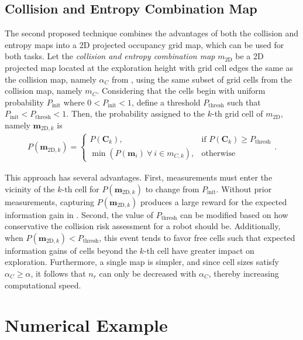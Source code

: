 \subsection{Collision and Entropy Combination Map}
The second proposed technique combines the advantages of both the collision and entropy maps into a 2D projected occupancy grid map, which can be used for both tasks. Let the \emph{collision and entropy combination map} $ m_\text{2D}$ be a 2D projected map located at the exploration height with grid cell edges the same as the collision map, namely $\alpha_C$ from , using the same subset of grid cells from the collision map, namely $ m_C$. Considering that the cells begin with uniform probability $P_\text{init}$ where $0<P_\text{init}<1$, define a threshold $P_\text{thresh}$ such that $P_\text{init}<P_\text{thresh}<1$. Then, the probability assigned to the $k$-th grid cell of $ m_\text{2D}$, namely $\mathbf{m}_{\text{2D},k}$ is
\begin{align}
\label{eqn:CombinationProjection2DMap}
P(\mathbf{m}_{\text{2D},k})= 
\begin{cases}
    P(\mathbf{C}_k),			& \text{if }P(\mathbf{C}_k)\geq P_\text{thresh}\\
    \min{(P(\mathbf{m}_i)\ \forall \ i\in m_{C,k})},              & \text{otherwise}
\end{cases}.
\end{align}

This approach has several advantages. First, measurements must enter the vicinity of the $k$-th cell for $P(\mathbf{m}_{\text{2D},k})$ to change from $P_\text{init}$. Without prior measurements, capturing $P(\mathbf{m}_{\text{2D},k})$ produces a large reward for the expected information gain in . Second, the value of $P_\text{thresh}$ can be modified based on how conservative the collision risk assessment for a robot should be. Additionally, when $P(\mathbf{m}_{\text{2D},k})<P_\text{thresh}$, this event tends to favor free cells such that expected information gains of cells beyond the $k$-th cell have greater impact on exploration. Furthermore, a single map is simpler, and since cell sizes satisfy $\alpha_C\geq\alpha$, it follows that $n_r$ can only be decreased with $\alpha_C$, thereby increasing computational speed.

\section{Numerical Example}
\label{sec:Compare2MapProjections}


